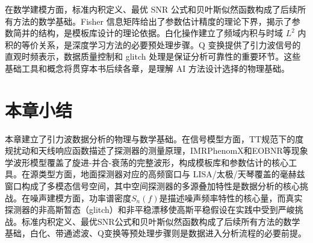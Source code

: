 在数学建模方面，标准内积定义、最优 SNR 公式和贝叶斯似然函数构成了后续所有方法的数学基础。Fisher 信息矩阵给出了参数估计精度的理论下界，揭示了参数简并的结构，是模板库设计的理论依据。白化操作建立了频域内积与时域 $L^2$ 内积的等价关系，是深度学习方法的必要预处理步骤。Q 变换提供了引力波信号的直观时频表示，数据质量控制和 glitch 处理是保证分析可靠性的重要环节。这些基础工具和概念将贯穿本书后续各章，是理解 AI 方法设计选择的物理基础。

\section{本章小结}

本章建立了引力波数据分析的物理与数学基础。在信号模型方面，TT规范下的度规扰动和天线响应函数描述了探测器的测量原理，IMRPhenomX和EOBNR等现象学波形模型覆盖了旋进-并合-衰荡的完整波形，构成模板库和参数估计的核心工具。在源类型方面，地面探测器对应的高频窗口与 LISA/太极/天琴覆盖的毫赫兹窗口构成了多模态信号空间，其中空间探测器的多源叠加特性是数据分析的核心挑战。在噪声建模方面，功率谱密度$S_n(f)$是描述噪声频率特性的核心量，而真实探测器的非高斯暂态（glitch）和非平稳漂移使高斯平稳假设在实践中受到严峻挑战。标准内积定义、最优SNR公式和贝叶斯似然函数构成了后续所有方法的数学基础，白化、带通滤波、Q变换等预处理步骤则是数据进入分析流程的必要前提。

